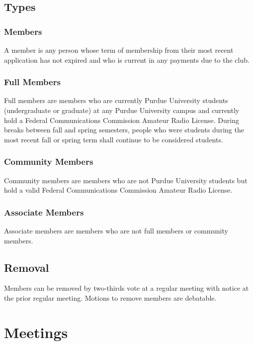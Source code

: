 \documentclass{article}
\begin{document}
\subsection{Types}

\subsubsection{Members}

A member is any person whose term of membership from their most recent
application has not expired and who is current in any payments due to the club.

\subsubsection{Full Members}

Full members are members who are currently Purdue University students
(undergraduate or graduate) at any Purdue University campus and currently hold a
Federal Communications Commission Amateur Radio License. During breaks between
fall and spring semesters, people who were students during the most recent fall
or spring term shall continue to be considered students.

\subsubsection{Community Members}

Community members are members who are not Purdue University students but hold a
valid Federal Communications Commission Amateur Radio License.

\subsubsection{Associate Members}

Associate members are members who are not full members or community members.

\subsection{Removal}

Members can be removed by two-thirds vote at a regular meeting with notice at
the prior regular meeting. Motions to remove members are debatable.

\section{Meetings}
\end{document}
